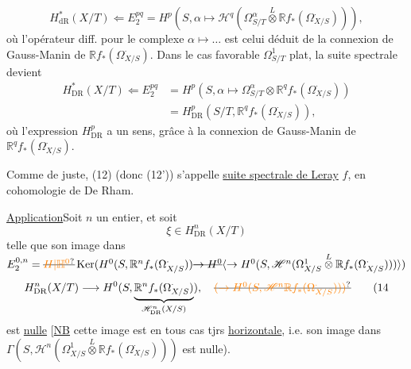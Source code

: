 \[
 H^*_{\mathrm{dR}}(X/T)\Longleftarrow E_2^{pq}
 =H^p(S,\alpha\longmapsto\mathscr H^q(\Omega^\alpha_{S/T}
 \overset{L}{\otimes}\mathbb R f_*(\Omega^\cdot_{X/S}))),
 \tag*{(12)}
\]
où l'opérateur diff. pour le complexe $\alpha\longmapsto\ldots$ est celui déduit de la connexion de Gauss-Manin de $\mathbb R f_*(\Omega^\cdot_{X/S})$. Dans le cas favorable $\Omega^1_{S/T}$ plat,   la suite spectrale devient
\[
\begin{aligned}
 H^*_{\mathrm{DR}}(X/T)\Longleftarrow E_2^{pq}
 &=H^p(S,\alpha\longmapsto\Omega^\alpha_{S/T}\otimes\mathbb R^qf_*(\Omega^\cdot_{X/S}))\\
 &=H^p_{\mathrm{DR}}(S/T,\mathbb R^q f_*(\Omega^\cdot_{X/S})),
\end{aligned}
\tag*{(12')}
\]
où l'expression $H^p_{\mathrm{DR}}$ a un sens, grâce à la connexion de Gauss-Manin de $\mathbb R^qf_*(\Omega^\cdot_{X/S})$.

Comme de juste,  (12)  (donc (12')) s'appelle \uline{suite spectrale de Leray}   $f$, en cohomologie de De Rham.

 \uline{Application}\quad Soit $n$ un entier, et soit
\[
 \xi\in H^n_{\mathrm{DR}}(X/T)
 \tag*{(13)}
\]
telle que son image dans $E_2^{0,n}=\deleted{\unsure{H|\mathbb H^0}}\operatorname{Ker}(H^0(S,\mathbb R^n f_*(\Omega^\cdot_{X/S}))\deleted{\to H^0}\inserted{\to H^0(S,\mathscr H^n(\Omega^1_{X/S}\overset{L}{\otimes}\mathbb R f_*(\Omega^\cdot_{X/S})))})$ 
\[
 H^n_{\mathrm{DR}}(X/T)\longrightarrow H^0(S,\underbrace{\mathbb R^n f_*(\Omega^\cdot_{X/S})}_{\mathscr H^n_{\mathrm{DR}}(X/S)}),
 \quad\deleted{\unsure{(\to H^0(S,\mathscr H^n\mathbb R f_*(\Omega^\cdot_{X/S}))) }}
 \tag*{(14}
\]
est \uline{nulle} [\uline{NB} cette image est en tous cas tjrs \uline{horizontale}, i.e. son image dans $\Gamma(S,\mathscr H^n(\Omega^1_{X/S}\overset{L}{\otimes}\mathbb R f_*(\Omega^\cdot_{X/S})))$ est nulle). 

